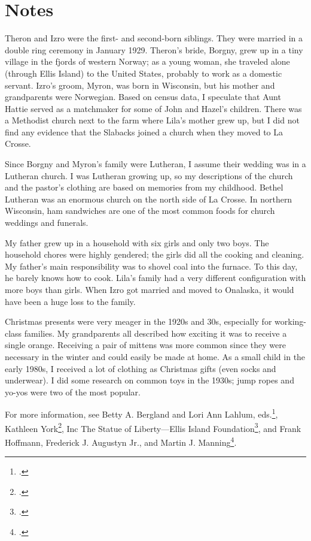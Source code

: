 \documentclass[
  letterpaper,
]{book}
\begin{document}
\section{Notes}\label{notes-6}

Theron and Izro were the first- and second-born siblings. They were
married in a double ring ceremony in January 1929. Theron's bride,
Borgny, grew up in a tiny village in the fjords of western Norway; as a
young woman, she traveled alone (through Ellis Island) to the United
States, probably to work as a domestic servant. Izro's groom, Myron, was
born in Wisconsin, but his mother and grandparents were Norwegian. Based
on census data, I speculate that Aunt Hattie served as a matchmaker for
some of John and Hazel's children. There was a Methodist church next to
the farm where Lila's mother grew up, but I did not find any evidence
that the Slabacks joined a church when they moved to La Crosse.

Since Borgny and Myron's family were Lutheran, I assume their wedding
was in a Lutheran church. I was Lutheran growing up, so my descriptions
of the church and the pastor's clothing are based on memories from my
childhood. Bethel Lutheran was an enormous church on the north side of
La Crosse. In northern Wisconsin, ham sandwiches are one of the most
common foods for church weddings and funerals.

My father grew up in a household with six girls and only two boys. The
household chores were highly gendered; the girls did all the cooking and
cleaning. My father's main responsibility was to shovel coal into the
furnace. To this day, he barely knows how to cook. Lila's family had a
very different configuration with more boys than girls. When Izro got
married and moved to Onalaska, it would have been a huge loss to the
family.

Christmas presents were very meager in the 1920s and 30s, especially for
working-class families. My grandparents all described how exciting it
was to receive a single orange. Receiving a pair of mittens was more
common since they were necessary in the winter and could easily be made
at home. As a small child in the early 1980s, I received a lot of
clothing as Christmas gifts (even socks and underwear). I did some
research on common toys in the 1930s; jump ropes and yo-yos were two of
the most popular.

For more information, see Betty A. Bergland and Lori Ann Lahlum,
eds.\footnote{.}, Kathleen York\footnote{.}, Inc The Statue of Liberty---Ellis Island
Foundation\footnote{.}, and Frank
Hoffmann, Frederick J. Augustyn Jr., and Martin J. Manning\footnote{.}.
\end{document}
